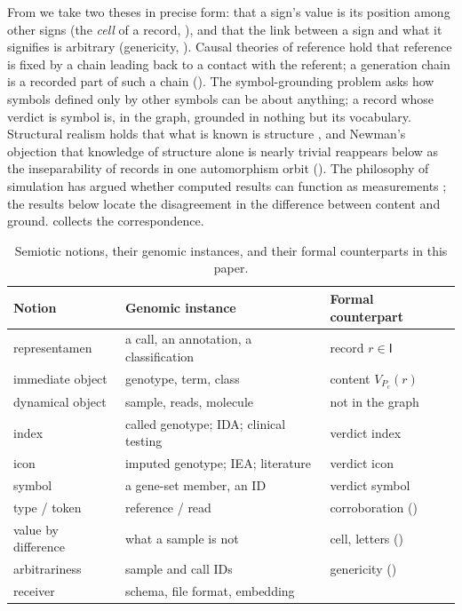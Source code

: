 \documentclass[11pt,twocolumn,a4paper]{article}
\theoremstyle{plain}
\theoremstyle{definition}
\theoremstyle{remark}
\newcommand{\Iset}{\mathsf{I}}
\newcommand{\Pc}{P_{\mathrm{c}}}
\newcommand{\Desc}{V}
\newcommand{\vsym}{\textsf{symbol}}
\newcommand{\vind}{\textsf{index}}
\newcommand{\vico}{\textsf{icon}}
\begin{document}
From \citet{saussure1916} we take two theses in precise form: that a sign's
value is its position among other signs (the \emph{cell} of a record,
), and that the link between a sign and what it signifies is
arbitrary (genericity, ). Causal theories of reference
\citep{kripke1980,putnam1975} hold that reference is fixed by a chain leading
back to a contact with the referent; a generation chain is a recorded part of
such a chain (). The symbol-grounding problem
\citep{harnad1990} asks how symbols defined only by other symbols can be about
anything; a record whose verdict is \vsym{} is, in the graph, grounded in
nothing but its vocabulary. Structural realism holds that what is known is
structure \citep{worrall1989,ladyman1998,cassirer1910}, and Newman's objection
\citep{newman1928} that knowledge of structure alone is nearly trivial
reappears below as the inseparability of records in one automorphism orbit
(). The philosophy of simulation has argued whether computed
results can function as measurements
\citep{morrison2009,parker2009,guala2002,morgan2005,winsberg2010}; the results
below locate the disagreement in the difference between content and ground.
 collects the correspondence.

\begin{table}[t]
\centering\small
\caption{Semiotic notions, their genomic instances, and their formal
counterparts in this paper.}
\label{tab:corr}
\begin{tabular}{@{}L{0.27\columnwidth}L{0.33\columnwidth}L{0.30\columnwidth}@{}}
\toprule
Notion & Genomic instance & Formal counterpart\\
\midrule
representamen & a call, an annotation, a classification & record $r\in\Iset$\\
immediate object & genotype, term, class & content $\Desc_{\Pc}(r)$\\
dynamical object & sample, reads, molecule & not in the graph\\
index & called genotype; IDA; clinical testing & verdict \vind\\
icon & imputed genotype; IEA; literature & verdict \vico\\
symbol & a gene-set member, an ID & verdict \vsym\\
type / token & reference / read & corroboration ()\\
value by difference & what a sample is not & cell, letters ()\\
arbitrariness & sample and call IDs & genericity ()\\
receiver & schema, file format, embedding & \\
\bottomrule
\end{tabular}
\end{table}
\end{document}
